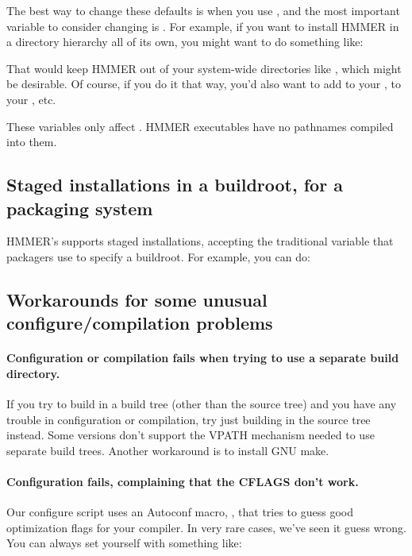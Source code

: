 The best way to change these defaults is when you use
, and the most important variable to consider
changing is . For example, if you want to install
HMMER in a directory hierarchy all of its own, you might want to do
something like:


That would keep HMMER out of your system-wide directories like
, which might be desirable. Of course, if you do
it that way, you'd also want to add  to
your ,  to your
, etc.

These variables only affect . HMMER executables
have no pathnames compiled into them.

\subsection{Staged installations in a buildroot, for a packaging system}

HMMER's  supports staged installations, accepting
the traditional  variable that packagers use to specify
a buildroot. For example, you can do:






\subsection{Workarounds for some unusual configure/compilation problems}

\paragraph{Configuration or compilation fails when trying to use a
  separate build directory.}  If you try to build in a build tree
(other than the source tree) and you have any trouble in configuration
or compilation, try just building in the source tree instead. Some
 versions don't support the VPATH mechanism needed to use
separate build trees. Another workaround is to install GNU make.

\paragraph{Configuration fails, complaining that the CFLAGS don't
  work.} Our configure script uses an Autoconf macro,
  , that tries to guess good optimization flags
  for your compiler. In very rare cases, we've seen it guess wrong.
  You can always set  yourself with something like:

